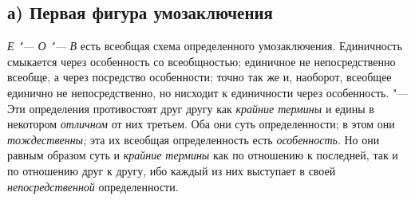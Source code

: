 \subsection[а) Первая фигура умозаключения]{а) Первая фигура умозаключения}

{\em Е "--- О "--- В}
есть всеобщая схема определенного умозаключения. Единичность
смыкается через особенность со всеобщностью; единичное не непосредственно
всеобще, а через посредство особенности; точно так же и, наоборот, всеобщее
единично не непосредственно, но нисходит к единичности через особенность.
"--- Эти определения противостоят друг другу как
{\em крайние термины} и
едины в некотором {\em отличном}
от них третьем. Оба они суть определенности; в этом они
{\em тождественны;} эта
их всеобщая определенность есть
{\em особенность}. Но они
равным образом суть и {\em крайние
термины} как по отношению к последней, так и по отношению
друг к другу, ибо каждый из них выступает в своей
{\em непосредственной}
определенности.


